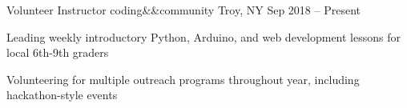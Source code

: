 


\begin{cventries}

  \cventry
  {Volunteer Instructor}
  {coding\&\&community}
  {Troy, NY}
  {Sep 2018 -- Present}
  {
    \begin{cvitems}
      \item {Leading weekly introductory Python, Arduino, and web development lessons for local 6th-9th graders}
      \item {Volunteering for multiple outreach programs throughout year, including hackathon-style events}
    \end{cvitems}
  }



\end{cventries}
